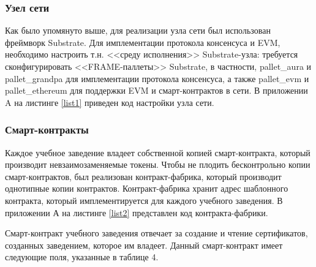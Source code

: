 \subsubsection{Узел сети}

Как было упомянуто выше, для реализации узла сети был использован фреймворк Substrate. Для имплементации протокола консенсуса и EVM, необходимо настроить т.н. <<среду исполнения>> Substrate-узла: требуется сконфигурировать <<FRAME-паллеты>> Substrate, в частности, pallet\_aura и pallet\_grandpa для имплементации протокола консенсуса, а также pallet\_evm и pallet\_ethereum для поддержки EVM и смарт-контрактов в сети. В приложении A на листинге \ref{list1} приведен код настройки узла сети.


\subsubsection{Смарт-контракты}

Каждое учебное заведение владеет собственной копией смарт-контракта, который производит невзаимозаменяемые токены. Чтобы не плодить бесконтрольно копии смарт-контрактов, был реализован контракт-фабрика, который производит однотипные копии контрактов. Контракт-фабрика хранит адрес шаблонного контракта, который имплементируется для каждого учебного заведения. В приложении А на листинге \ref{list2} представлен код контракта-фабрики.

Смарт-контракт учебного заведения отвечает за создание и чтение сертификатов, созданных заведением, которое им владеет. Данный смарт-контракт имеет следующие поля, указанные в таблице 4.

\begin{table}[h!]
	\captionsetup{justification=raggedleft,singlelinecheck=off}
	\caption{Поля смарт-контракта учебного заведения}
\end{table}

